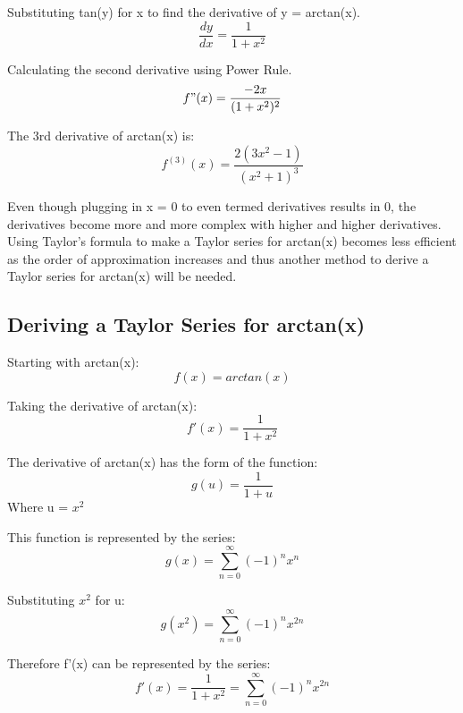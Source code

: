 \documentclass[12pt, titlepage]{article}
\begin{document}
Substituting tan(y) for x to find the derivative of y = arctan(x).
\begin{equation*}
 \frac{dy}{dx}  = \frac{1}{1 + x^{2}}
\end{equation*}

Calculating the second derivative using Power Rule.
\begin{equation*}
    f"(x) = \frac{-2x}{(1+x^{2})^{2}}
\end{equation*}

The 3rd derivative of arctan(x) is:
\begin{equation*}
    f^{(3)}(x) = \frac{2(3x^{2}-1)}{(x^{2}+1)^{3}}
\end{equation*}

Even though plugging in x = 0 to even termed derivatives results in 0, the derivatives become more and more complex with higher and higher derivatives. Using Taylor's formula to make a Taylor series for arctan(x) becomes less efficient as the order of approximation increases and thus another method to derive a Taylor series for arctan(x) will be needed.

\subsection{Deriving a Taylor Series for arctan(x)}
Starting with arctan(x):
\begin{equation*}
  f(x) = arctan(x)
\end{equation*}

Taking the derivative of arctan(x):
\begin{equation*}
f'(x) = \frac{1}{1 + x^{2}}
\end{equation*}

The derivative of arctan(x) has the form of the function:
\begin{equation*}
    g(u) = \frac{1}{1+u}
\end{equation*}
Where u = \(x^2\)

This function is represented by the series:
\begin{equation*}
    g(x) = \sum_{n=0}^{\infty} (-1)^{n}x^{n}
\end{equation*}

Substituting \(x^{2}\) for u: 
\begin{equation*}
    g(x^{2}) = \sum_{n=0}^{\infty} (-1)^{n}x^{2n}
\end{equation*}

Therefore f'(x) can be represented by the series:
\begin{equation*}
f'(x) = \frac{1}{1 + x^{2}} = \sum_{n=0}^{\infty} (-1)^{n}x^{2n}
\end{equation*}
\end{document}
